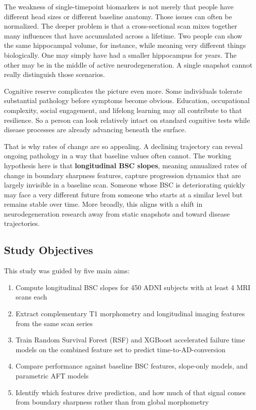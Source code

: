 \documentclass[blue]{ludusofficial}  %
\begin{document}
The weakness of single-timepoint biomarkers is not merely that people have different head sizes or different baseline anatomy. Those issues can often be normalized. The deeper problem is that a cross-sectional scan mixes together many influences that have accumulated across a lifetime. Two people can show the same hippocampal volume, for instance, while meaning very different things biologically. One may simply have had a smaller hippocampus for years. The other may be in the middle of active neurodegeneration. A single snapshot cannot really distinguish those scenarios.

Cognitive reserve complicates the picture even more. Some individuals tolerate substantial pathology before symptoms become obvious. Education, occupational complexity, social engagement, and lifelong learning may all contribute to that resilience. So a person can look relatively intact on standard cognitive tests while disease processes are already advancing beneath the surface.

That is why rates of change are so appealing. A declining trajectory can reveal ongoing pathology in a way that baseline values often cannot. The working hypothesis here is that \textbf{longitudinal BSC slopes}, meaning annualized rates of change in boundary sharpness features, capture progression dynamics that are largely invisible in a baseline scan. Someone whose BSC is deteriorating quickly may face a very different future from someone who starts at a similar level but remains stable over time. More broadly, this aligns with a shift in neurodegeneration research away from static snapshots and toward disease trajectories.

\subsection{Study Objectives}

This study was guided by five main aims:

\begin{enumerate}
    \item Compute longitudinal BSC slopes for 450 ADNI subjects with at least 4 MRI scans each
    \item Extract complementary T1 morphometry and longitudinal imaging features from the same scan series
    \item Train Random Survival Forest (RSF) and XGBoost accelerated failure time models on the combined feature set to predict time-to-AD-conversion
    \item Compare performance against baseline BSC features, slope-only models, and parametric AFT models
    \item Identify which features drive prediction, and how much of that signal comes from boundary sharpness rather than from global morphometry
\end{enumerate}
\end{document}
